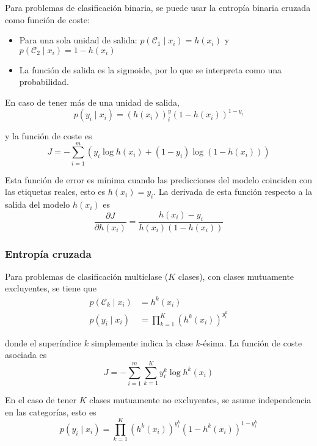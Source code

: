 \noindent Para problemas de clasificación binaria, se puede usar la entropía binaria cruzada como función de coste:
\begin{itemize}
\item Para una sola unidad de salida: $p(\mathcal{C}_1 \mid x_i) = h(x_i)$ y $p(\mathcal{C}_2 \mid x_i) = 1 - h(x_i)$
\item La función de salida es la sigmoide, por lo que se interpreta como una probabilidad.
\end{itemize}

\noindent En caso de tener más de una unidad de salida,
\begin{equation}
p(y_i \mid x_i) = (h(x_i))^y_i (1 - h(x_i))^{1 - y_i}
\end{equation}

\noindent y la función de coste es
\begin{equation}
J = -\sum_{i = 1}^m \left(y_i \log h(x_i) + (1 - y_i) \log (1 - h(x_i))\right)
\end{equation}

Esta función de error es mínima cuando las predicciones del modelo coinciden con las etiquetas reales, esto es $h(x_i) = y_i$. La derivada de esta función respecto a la salida del modelo $h(x_i)$ es
\begin{equation}
\frac{\partial J}{\partial h(x_i)} = \frac{h(x_i) - y_i}{h(x_i)(1 - h(x_i))}
\end{equation}

\subsubsection{Entropía cruzada}

\noindent Para problemas de clasificación multiclase ($K$ clases), con clases mutuamente excluyentes, se tiene que 
\begin{align}
p (\mathcal{C}_k \mid x_i) &= h^k(x_i) \\
p (y_i \mid x_i) &= \prod_{k = 1}^K (h^k(x_i))^{y_i^k}
\end{align}

donde el superíndice $k$ simplemente indica la clase $k$-ésima. La función de coste asociada es 
\begin{equation}
J = -\sum_{i = 1}^m \sum_{k = 1}^K y_i^k \log h^k(x_i)
\end{equation}

En el caso de tener $K$ clases mutuamente no excluyentes, se asume independencia en las categorías, esto es
\begin{equation}
p (y_i \mid x_i) = \prod_{k = 1}^K (h^k(x_i))^{y_i^k} (1 - h^k(x_i))^{1 - y_i^k}
\end{equation}

